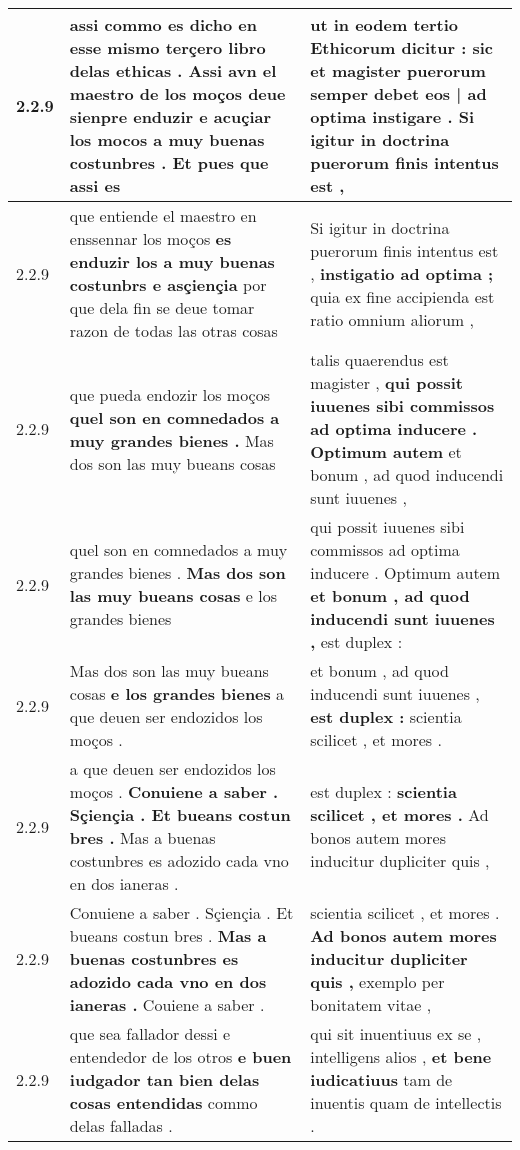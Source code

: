\begin{tabular}{|p{1cm}|p{6.5cm}|p{6.5cm}|}
2.2.9 & assi commo es dicho en esse mismo terçero libro delas ethicas . \textbf{ Assi avn el maestro de los moços deue sienpre enduzir e acuçiar los mocos a muy buenas costunbres . } Et pues que assi es & ut in eodem tertio Ethicorum dicitur : \textbf{ sic et magister puerorum semper debet eos | ad optima instigare . } Si igitur in doctrina puerorum finis intentus est , \\\hline
2.2.9 & que entiende el maestro en enssennar los moços \textbf{ es enduzir los a muy buenas costunbrs e asçiençia } por que dela fin se deue tomar razon de todas las otras cosas & Si igitur in doctrina puerorum finis intentus est , \textbf{ instigatio ad optima ; } quia ex fine accipienda est ratio omnium aliorum , \\\hline
2.2.9 & que pueda endozir los moços \textbf{ quel son en comnedados a muy grandes bienes . } Mas dos son las muy bueans cosas & talis quaerendus est magister , \textbf{ qui possit iuuenes sibi commissos ad optima inducere . Optimum autem } et bonum , ad quod inducendi sunt iuuenes , \\\hline
2.2.9 & quel son en comnedados a muy grandes bienes . \textbf{ Mas dos son las muy bueans cosas } e los grandes bienes & qui possit iuuenes sibi commissos ad optima inducere . Optimum autem \textbf{ et bonum , ad quod inducendi sunt iuuenes , } est duplex : \\\hline
2.2.9 & Mas dos son las muy bueans cosas \textbf{ e los grandes bienes } a que deuen ser endozidos los moços . & et bonum , ad quod inducendi sunt iuuenes , \textbf{ est duplex : } scientia scilicet , et mores . \\\hline
2.2.9 & a que deuen ser endozidos los moços . \textbf{ Conuiene a saber . Sçiençia . Et bueans costun bres . } Mas a buenas costunbres es adozido cada vno en dos ianeras . & est duplex : \textbf{ scientia scilicet , et mores . } Ad bonos autem mores inducitur dupliciter quis , \\\hline
2.2.9 & Conuiene a saber . Sçiençia . Et bueans costun bres . \textbf{ Mas a buenas costunbres es adozido cada vno en dos ianeras . } Couiene a saber . & scientia scilicet , et mores . \textbf{ Ad bonos autem mores inducitur dupliciter quis , } exemplo per bonitatem vitae , \\\hline
2.2.9 & que sea fallador dessi e entendedor de los otros \textbf{ e buen iudgador tan bien delas cosas entendidas } commo delas falladas . & qui sit inuentiuus ex se , intelligens alios , \textbf{ et bene iudicatiuus } tam de inuentis quam de intellectis . \\\hline

\end{tabular}

